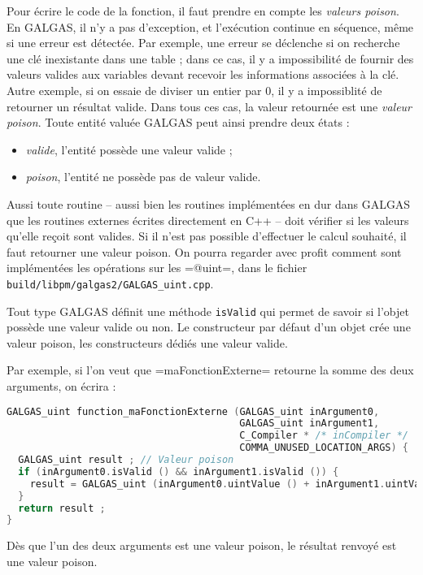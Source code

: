 Pour écrire le code de la fonction, il faut prendre en compte les \emph{valeurs poison}. En GALGAS, il n'y a pas d'exception, et l'exécution continue en séquence, même si une erreur est détectée. Par exemple, une erreur se déclenche si on recherche une clé inexistante dans une table ; dans ce cas, il y a impossibilité de fournir des valeurs valides aux variables devant recevoir les informations associées à la clé. Autre exemple, si on essaie de diviser un entier par $0$, il y a impossiblité de retourner un résultat valide. Dans tous ces cas, la valeur retournée est une \emph{valeur poison}. Toute entité valuée GALGAS peut ainsi prendre deux états :
\begin{itemize}
  \item \emph{valide}, l'entité possède une valeur valide ;
  \item \emph{poison}, l'entité ne possède pas de valeur valide.
\end{itemize}

Aussi toute routine -- aussi bien les routines implémentées en dur dans GALGAS que les routines externes écrites directement en C++ -- doit vérifier si les valeurs qu'elle reçoit sont valides. Si il n'est pas possible d'effectuer le calcul souhaité, il faut retourner une valeur poison. On pourra regarder avec profit comment sont implémentées les opérations sur les \ggst=@uint=, dans le fichier \texttt{build/libpm/galgas2/GALGAS\_uint.cpp}.


Tout type GALGAS définit une méthode \texttt{isValid} qui permet de savoir si l'objet possède une valeur valide ou non. Le constructeur par défaut d'un objet crée une valeur poison, les constructeurs dédiés une valeur valide.

Par exemple, si l'on veut que \ggst=maFonctionExterne= retourne la somme des deux arguments, on écrira :

\begin{lstlisting}[language=C++]
GALGAS_uint function_maFonctionExterne (GALGAS_uint inArgument0,
                                        GALGAS_uint inArgument1,
                                        C_Compiler * /* inCompiler */
                                        COMMA_UNUSED_LOCATION_ARGS) {
  GALGAS_uint result ; // Valeur poison
  if (inArgument0.isValid () && inArgument1.isValid ()) {
    result = GALGAS_uint (inArgument0.uintValue () + inArgument1.uintValue ()) ;
  }
  return result ;
}
\end{lstlisting}

Dès que l'un des deux arguments est une valeur poison, le résultat renvoyé est une valeur poison.


